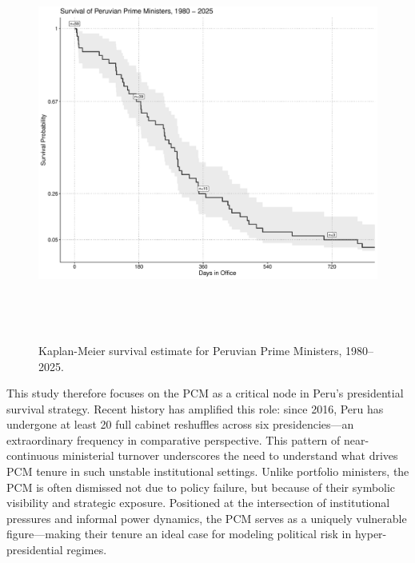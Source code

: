 \documentclass[a4paper, 12pt]{article}
\begin{document}
\begin{figure}[ht]
\centering
\includegraphics[width=\textwidth,height=13cm]{kaplanDuration.pdf}
\caption[Survival of Prime Ministers in Peru]{Kaplan-Meier survival estimate for Peruvian Prime Ministers, 1980--2025.}
\label{kaplanDuration} 
\end{figure}

This study therefore focuses on the PCM as a critical node in Peru’s presidential survival strategy. Recent history has amplified this role: since 2016, Peru has undergone at least 20 full cabinet reshuffles across six presidencies—an extraordinary frequency in comparative perspective. This pattern of near-continuous ministerial turnover underscores the need to understand what drives PCM tenure in such unstable institutional settings. Unlike portfolio ministers, the PCM is often dismissed not due to policy failure, but because of their symbolic visibility and strategic exposure. Positioned at the intersection of institutional pressures and informal power dynamics, the PCM serves as a uniquely vulnerable figure—making their tenure an ideal case for modeling political risk in hyper-presidential regimes.
\end{document}

